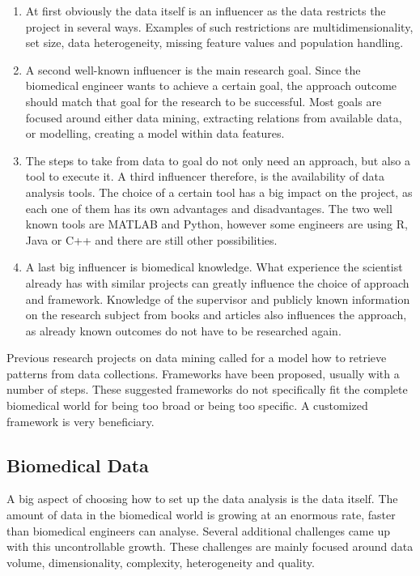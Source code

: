 \documentclass[10pt,a4paper]{article}
\begin{document}
	\begin{enumerate}
		\item[] At first obviously the data itself is an influencer as the data restricts the project in several ways. Examples of such restrictions are multidimensionality, set size, data heterogeneity, missing feature values and population handling.
		\item[] A second well-known influencer is the main research goal. Since the biomedical engineer wants to achieve a certain goal, the approach outcome should match that goal for the research to be successful. Most goals are focused around either data mining, extracting relations from available data, or modelling, creating a model within data features.
		\item[] The steps to take from data to goal do not only need an approach, but also a tool to execute it. A third influencer therefore, is the availability of data analysis tools. The choice of a certain tool has a big impact on the project, as each one of them has its own advantages and disadvantages. The two well known tools are MATLAB and Python, however some engineers are using R, Java or C++ and there are still other possibilities.
		\item[] A last big influencer is biomedical knowledge. What experience the scientist already has with similar projects can greatly influence the choice of approach and framework. Knowledge of the supervisor and publicly known information on the research subject from books and articles also influences the approach, as already known outcomes do not have to be researched again.
	\end{enumerate}
	    
	Previous research projects on data mining called for a model how to retrieve patterns from data collections. Frameworks have been proposed, usually with a number of steps\cite{CIOS20021}. These suggested frameworks do not specifically fit the complete biomedical world for being too broad\cite{fayyad1996knowledge} or being too specific.\cite{cios2000knowledge} A customized framework is very beneficiary. 
	
	\subsection{Biomedical Data}
	\label{subsec:BiomedicalData}
	
	A big aspect of choosing how to set up the data analysis is the data itself. The amount of data in the biomedical world is growing at an enormous rate, faster than biomedical engineers can analyse. Several additional challenges came up with this uncontrollable growth. These challenges are mainly focused around data volume, dimensionality, complexity, heterogeneity and quality\cite{chen2006medical, doi:10.1093/bib/bbx044}.
	
\end{document}
